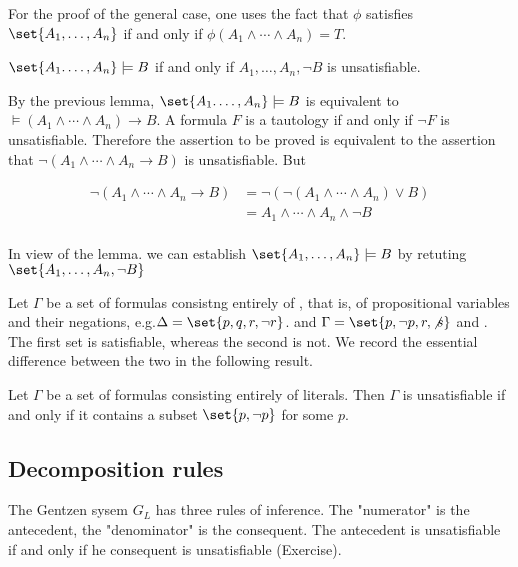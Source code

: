 For the proof of the general case, one uses the fact that $\phi$ satisfies $\set{A_1, \ldots, A_n}$ if and only if $\phi(A_1 \land \cdots \land A_n) = T$. 

\begin{lemma}
$\set{A_1. \ldots , A_n} \models B$ if and only if $A_1, \ldots , A_n, \neg B$ is unsatisfiable.
\end{lemma}

 By the previous lemma, $\set{A_1. \ldots , A_n} \models B$  is equivalent to $\models (A_1 \land \cdots \land A_n) \to B$. A formula $F$ is a tautology if and only if $\neg F$ is unsatisfiable.  Therefore the assertion to be proved is equivalent to the assertion that $\neg (A_1 \land \cdots \land A_n \to B)$ is unsatisfiable.  But

\begin{align}
  \neg (A_1 \land \cdots \land A_n \to B) &=  \neg(\neg(A_1 \land \cdots \land A_n) \lor B) \\
  &= A_1 \land \cdots \land A_n \land \neg B \\
\end{align}


In view of the lemma. we can establish $\set{A_1, \ldots, A_n} \models B$ by retuting $\set{A_1,  \ldots , A_n, \neg B}$

Let $\Gamma$ be a set of formulas consistng entirely of , that is, of propositional variables and their negations, e.g.$\Delta = \set{p, q, r, \neg r}$. and  $\Gamma = \set{p, \neg p, r, \not s}$ and  . The first set is satisfiable, whereas the second is not.  We record the essential difference between the two in the following result.

\begin{lemma}
Let $\Gamma$ be a set of formulas consisting entirely of literals.  Then $\Gamma$ is unsatisfiable if and only if it contains a subset $\set{p, \neg p}$ for some $p$.
\end{lemma}

\subsection{Decomposition rules}

The Gentzen sysem $G_L$ has three rules of inference.    The "numerator" is the antecedent, the "denominator" is the consequent.  The antecedent is unsatisfiable if and only if he consequent is unsatisfiable (Exercise).

